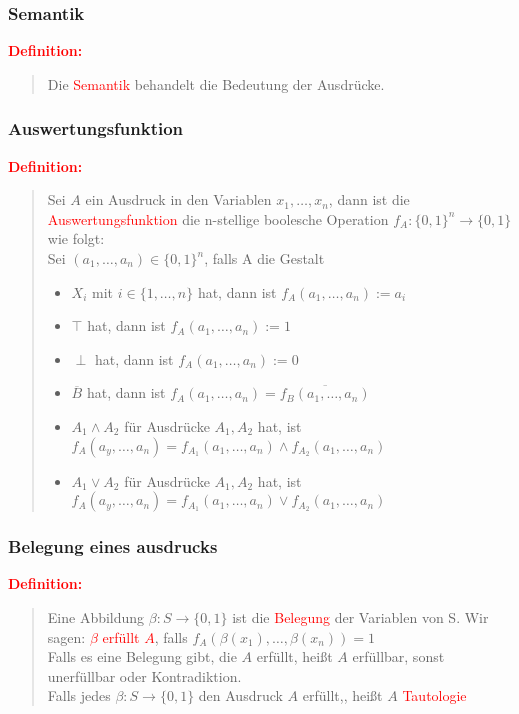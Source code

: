 \documentclass{article}
\newcommand{\red}[1]{\textcolor{red}{#1}}
\newcommand{\de}[1]{\red{\textbf{Definition: }}\begin{quote}#1\end{quote}}
\newcommand{\n}[1]{\overline{#1}}
\begin{document}
\subsubsection{Semantik}

\de{Die \red{Semantik} behandelt die Bedeutung der Ausdrücke.}

\newpage
\subsubsection{Auswertungsfunktion}

\de{Sei $A$ ein Ausdruck in den Variablen $x_1, \dots, x_n$, dann ist die \red{Auswertungsfunktion} die n-stellige boolesche Operation $f_A: \{0, 1\}^n \to \{0, 1\}$ wie folgt:\\
Sei $(a_1, \dots, a_n) \in \{0, 1\}^n$, falls A die Gestalt
\begin{itemize}
    \item $X_i$ mit $i \in \{1, \dots, n\}$ hat, dann ist $f_A(a_1, \dots, a_n) := a_i$
    \item $\top$ hat, dann ist $f_A(a_1, \dots, a_n) := 1$
    \item $\perp$ hat, dann ist $f_A(a_1, \dots, a_n) := 0$
    \item $\n{B}$ hat, dann ist $f_A(a_1, \dots, a_n) = \n{f_B(a_1, \dots, a_n)}$
    \item $A_1 \land A_2$ für Ausdrücke $A_1, A_2$ hat, ist\\
    $f_A(a_y, \dots, a_n) = f_{A_1}(a_1, \dots, a_n) \land f_{A_2}(a_1, \dots, a_n)$
    \item $A_1 \lor A_2$ für Ausdrücke $A_1, A_2$ hat, ist\\
    $f_A(a_y, \dots, a_n) = f_{A_1}(a_1, \dots, a_n) \lor f_{A_2}(a_1, \dots, a_n)$
\end{itemize}
}

\subsubsection{Belegung eines ausdrucks}

\de{
    Eine Abbildung $\beta: S \to \{0, 1\}$ ist die \red{Belegung} der Variablen von S. Wir sagen: \red{$\beta$ erfüllt $A$}, falls $f_A(\beta(x_1), \dots, \beta(x_n)) = 1$\\
    Falls es eine Belegung gibt, die $A$ erfüllt, heißt $A$ erfüllbar, sonst unerfüllbar oder Kontradiktion.\\
    Falls jedes $\beta: S \to \{0, 1\}$ den Ausdruck $A$ erfüllt,, heißt $A$ \red{Tautologie}
}
\end{document}
